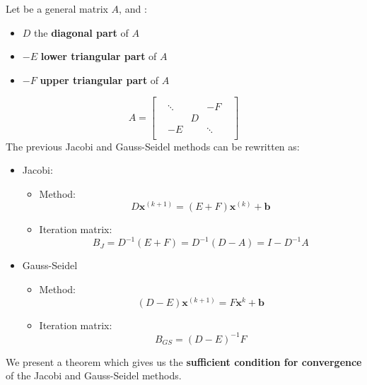 Let be a general matrix $A$, and :
\begin{itemize}
    \item $D$ the \textbf{diagonal part} of $A$
    \item $-E$ \textbf{lower triangular part} of $A$
    \item $-F$ \textbf{upper triangular part} of $A$
\end{itemize}
\begin{equation*}
    A = \begin{bmatrix}
        & & & & \\
        & \ddots &   & -F     & \\
        &        & D &        & \\
        & -E     &   & \ddots & \\
        & & & &
    \end{bmatrix}
\end{equation*}
The previous Jacobi and Gauss-Seidel methods can be rewritten as:
\begin{itemize}
    \item Jacobi:
    \begin{itemize}
        \item Method:
        \begin{equation*}
            D\mathbf{x}^{\left(k+1\right)} = \left(E+F\right)\mathbf{x}^{\left(k\right)} + \mathbf{b}
        \end{equation*}
        \item Iteration matrix:
        \begin{equation*}
            B_{J} = D^{-1}\left(E+F\right) = D^{-1}\left(D-A\right) = I-D^{-1}A
        \end{equation*}
    \end{itemize}

    \item Gauss-Seidel
    \begin{itemize}
        \item Method:
        \begin{equation*}
            \left(D-E\right)\mathbf{x}^{\left(k+1\right)} = F\mathbf{x}^{k} + \mathbf{b}
        \end{equation*}
        \item Iteration matrix:
        \begin{equation*}
            B_{GS} = \left(D-E\right)^{-1}F
        \end{equation*}
    \end{itemize}
\end{itemize}
We present a theorem which gives us the \textbf{sufficient condition for convergence} of the Jacobi and Gauss-Seidel methods.

